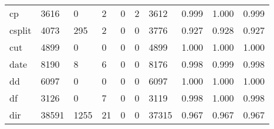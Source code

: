 \begin{longtable}{lp{2.0cm}p{2.0cm}p{2.0cm}p{2.0cm}p{2.0cm}p{2.0cm}p{2.0cm}p{2.0cm}p{2.0cm}}
cp        &                   3616 &                                  0 &                                 2 &                                0 &                                 2 &                            3612 &                                0.999 &                                  1.000 &                                0.999 \\
csplit    &                   4073 &                                295 &                                 2 &                                0 &                                 0 &                            3776 &                                0.927 &                                  0.928 &                                0.927 \\
cut       &                   4899 &                                  0 &                                 0 &                                0 &                                 0 &                            4899 &                                1.000 &                                  1.000 &                                1.000 \\
date      &                   8190 &                                  8 &                                 6 &                                0 &                                 0 &                            8176 &                                0.998 &                                  0.999 &                                0.998 \\
dd        &                   6097 &                                  0 &                                 0 &                                0 &                                 0 &                            6097 &                                1.000 &                                  1.000 &                                1.000 \\
df        &                   3126 &                                  0 &                                 7 &                                0 &                                 0 &                            3119 &                                0.998 &                                  1.000 &                                0.998 \\
dir       &                  38591 &                               1255 &                                21 &                                0 &                                 0 &                           37315 &                                0.967 &                                  0.967 &                                0.967 \\

\end{longtable}
